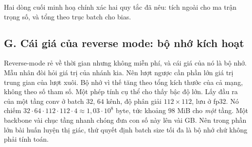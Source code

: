 \documentclass[../../../deep_learning.tex]{subfiles}
\begin{document}
Hai dòng cuối minh hoạ chính xác hai quy tắc đã nêu: tích ngoài cho ma trận trọng số, và tổng theo trục batch cho bias.

\subsection{G. Cái giá của reverse mode: bộ nhớ kích hoạt}
Reverse-mode rẻ về thời gian nhưng không miễn phí, và cái giá của nó là bộ nhớ. Mẫu nhân đòi hỏi giá trị của nhánh kia. Nên lượt ngược cần phần lớn giá trị trung gian của lượt xuôi. Bộ nhớ vì thế tăng theo tổng kích thước  của cả mạng, không theo số tham số. Một phép tính cụ thể cho thấy bậc độ lớn. Lấy đầu ra của một tầng conv ở batch \(32\), \(64\) kênh, độ phân giải \(112\times112\), lưu ở fp32. Nó chiếm \(32\cdot 64\cdot 112\cdot 112\cdot 4 \approx 1{,}03\cdot 10^{8}\) byte, tức khoảng \(98\) MiB cho \emph{một} tầng. Một backbone vài chục tầng nhanh chóng đưa con số này lên vài GB. Nên trong phần lớn bài huấn luyện thị giác, thứ quyết định batch size tối đa là bộ nhớ chứ không phải tính toán.
\end{document}
